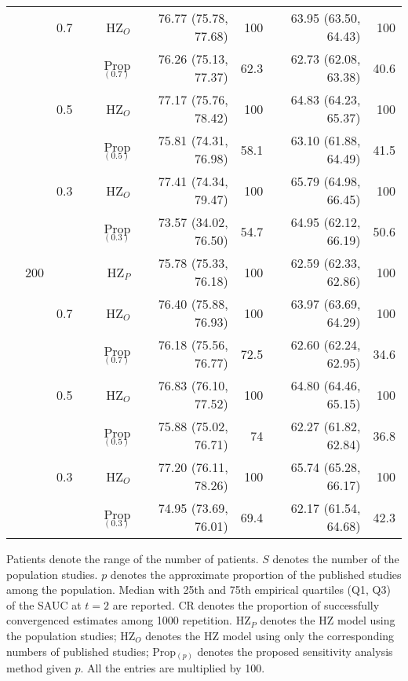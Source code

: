 \begin{table}[!htb]
\begin{threeparttable}
\begin{tabular}[t]{rrrrrrrr}
 &  & 0.7 & HZ$_O$ & 76.77 (75.78, 77.68) & 100 & 63.95 (63.50, 64.43) & 100\\
 &  &  & Prop$_{(0.7)}$ & 76.26 (75.13, 77.37) & 62.3 & 62.73 (62.08, 63.38) & 40.6\\
 &  & 0.5 & HZ$_O$ & 77.17 (75.76, 78.42) & 100 & 64.83 (64.23, 65.37) & 100\\
 &  &  & Prop$_{(0.5)}$ & 75.81 (74.31, 76.98) & 58.1 & 63.10 (61.88, 64.49) & 41.5\\
 &  & 0.3 & HZ$_O$ & 77.41 (74.34, 79.47) & 100 & 65.79 (64.98, 66.45) & 100\\
 &  &  & Prop$_{(0.3)}$ & 73.57 (34.02, 76.50) & 54.7 & 64.95 (62.12, 66.19) & 50.6\\
\addlinespace
 & 200 &  & HZ$_P$ & 75.78 (75.33, 76.18) & 100 & 62.59 (62.33, 62.86) & 100\\
 &  & 0.7 & HZ$_O$ & 76.40 (75.88, 76.93) & 100 & 63.97 (63.69, 64.29) & 100\\
 &  &  & Prop$_{(0.7)}$ & 76.18 (75.56, 76.77) & 72.5 & 62.60 (62.24, 62.95) & 34.6\\
 &  & 0.5 & HZ$_O$ & 76.83 (76.10, 77.52) & 100 & 64.80 (64.46, 65.15) & 100\\
 &  &  & Prop$_{(0.5)}$ & 75.88 (75.02, 76.71) & 74 & 62.27 (61.82, 62.84) & 36.8\\
 &  & 0.3 & HZ$_O$ & 77.20 (76.11, 78.26) & 100 & 65.74 (65.28, 66.17) & 100\\
 &  &  & Prop$_{(0.3)}$ & 74.95 (73.69, 76.01) & 69.4 & 62.17 (61.54, 64.68) & 42.3\\
\bottomrule
\end{tabular}
\begin{tablenotes}
\item 
  Patients denote the range of the number of patients.
  $S$ denotes the number of the population studies.
  $p$ denotes the approximate proportion of the published studies among the population.
	Median with 25th and 75th empirical quartiles (Q1, Q3) of the SAUC at $t=2$ are reported. 
	CR denotes the proportion of successfully convergenced estimates among 1000 repetition.
	HZ$_P$ denotes the HZ model using the population studies; 
	HZ$_O$ denotes the HZ model using only the corresponding numbers of published studies;
	Prop$_{(p)}$ denotes the proposed sensitivity analysis method given $p$.
	All the entries are multiplied by 100.
\end{tablenotes}
\end{threeparttable}
\end{table}

